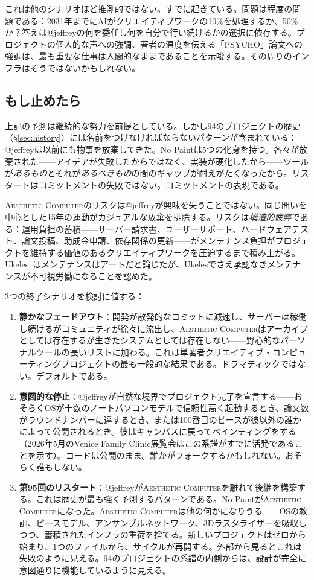 \documentclass[10pt,letterpaper,twocolumn]{article}
\newcommand{\ac}{\textsc{Aesthetic Computer}}
\begin{document}
これは他のシナリオほど推測的ではない。すでに起きている。問題は程度の問題である：2031年までにAIがクリエイティブワークの10\%を処理するか、50\%か？答えは@jeffreyの何を委任し何を自分で行い続けるかの選択に依存する。プロジェクトの個人的な声への強調、著者の温度を伝える「PSYCHO」論文への強調は、最も重要な仕事は人間的なままであることを示唆する。その周りのインフラはそうではないかもしれない。

\subsection{もし止めたら}
\label{sec:giveup}

上記の予測は継続的な努力を前提としている。しかし94のプロジェクトの歴史（\S\ref{sec:history}）には名前をつけなければならないパターンが含まれている：@jeffreyは以前にも物事を放棄してきた。No Paintは5つの化身を持つ。各々が放棄された——アイデアが失敗したからではなく、実装が硬化したから——ツールが\emph{あるもの}とそれが\emph{あるべきもの}の間のギャップが耐えがたくなったから。リスタートはコミットメントの失敗ではない。コミットメントの表現である。

\ac{}のリスクは@jeffreyが興味を失うことではない。同じ問いを中心とした15年の運動がカジュアルな放棄を排除する。リスクは\emph{構造的疲弊}である：運用負担の蓄積——サーバー請求書、ユーザーサポート、ハードウェアテスト、論文投稿、助成金申請、依存関係の更新——がメンテナンス負担がプロジェクトを維持する価値のあるクリエイティブワークを圧迫するまで積み上がる。Ukeles~\citep{ukeles1969manifesto}はメンテナンスはアートだと論じたが、Ukelesでさえ承認なきメンテナンスが不可視労働になることを認めた。

3つの終了シナリオを検討に値する：

\begin{enumerate}
  \item \textbf{静かなフェードアウト}：開発が散発的なコミットに減速し、サーバーは稼働し続けるがコミュニティが徐々に流出し、\ac{}はアーカイブとしては存在するが生きたシステムとしては存在しない——野心的なパーソナルツールの長いリストに加わる。これは単著者クリエイティブ・コンピューティングプロジェクトの最も一般的な結果である。ドラマティックではない。デフォルトである。

  \item \textbf{意図的な停止}：@jeffreyが自然な境界でプロジェクト完了を宣言する——おそらくOSが十数のノートパソコンモデルで信頼性高く起動するとき、論文数がラウンドナンバーに達するとき、または100番目のピースが彼以外の誰かによって公開されるとき。彼はキャンバスに戻ってペインティングをする（2026年5月のVenice Family Clinic展覧会はこの系譜がすでに活発であることを示す）。コードは公開のまま。誰かがフォークするかもしれない。おそらく誰もしない。

  \item \textbf{第95回のリスタート}：@jeffreyが\ac{}を離れて後継を構築する。これは歴史が最も強く予測するパターンである。No Paintが\ac{}になった。\ac{}は他の何かになりうる——OSの教訓、ピースモデル、アンサンブルネットワーク、3Dラスタライザーを吸収しつつ、蓄積されたインフラの重荷を捨てる。新しいプロジェクトはゼロから始まり、1つのファイルから、サイクルが再開する。外部から見るとこれは失敗のように見える。94のプロジェクトの系譜の内側からは、設計が完全に意図通りに機能しているように見える。
\end{enumerate}
\end{document}
